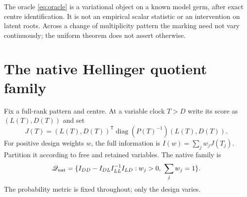 \documentclass[11pt,reqno]{amsart}
\numberwithin{equation}{section}
\theoremstyle{definition}
\theoremstyle{remark}
\newcommand{\cQ}{\mathscr Q}
\begin{document}
The oracle \eqref{eq:oracle} is a variational object on a known model germ, after exact centre identification. It is not an empirical scalar statistic or an intervention on latent roots. Across a change of multiplicity pattern the marking need not vary continuously; the uniform theorem does not assert otherwise.

\section{The native Hellinger quotient family}\label{sec:native}
Fix a full-rank pattern and centre. At a variable clock $T>D$ write its score as $(L(T),D(T))$ and set
\[
 J(T)=(L(T),D(T))^{\mathsf T}\operatorname{diag}(P(T)^{-1})(L(T),D(T)).
\]
For positive design weights $w$, the full information is $I(w)=\sum_jw_jJ(T_j)$. Partition it according to free and retained variables. The native family is
\begin{equation}\label{eq:native-family}
 \cQ_{\rm nat}=\{I_{DD}-I_{DL}I_{LL}^{-1}I_{LD}:w_j>0,\ \sum_jw_j=1\}.
\end{equation}
The probability metric is fixed throughout; only the design varies.
\end{document}
